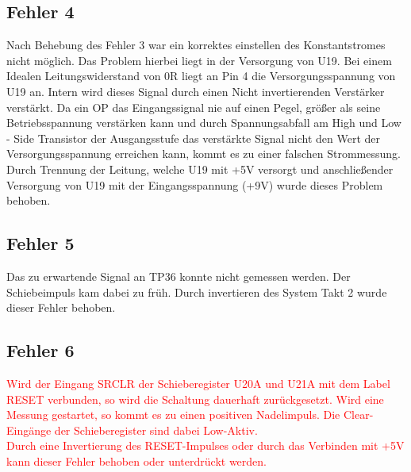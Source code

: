 \subsection{Fehler 4}

Nach Behebung des \glqq Fehler 3 \grqq{} war ein korrektes einstellen des Konstantstromes nicht möglich. Das Problem hierbei liegt in der Versorgung von U19. Bei einem Idealen Leitungswiderstand von 0R liegt an Pin 4 die Versorgungsspannung von U19 an. Intern wird dieses Signal durch einen \glqq Nicht invertierenden Verstärker \grqq{} verstärkt. Da ein OP das Eingangssignal nie auf einen Pegel, größer als seine Betriebsspannung verstärken kann und durch Spannungsabfall am \glqq High und Low - Side Transistor \grqq{} der Ausgangsstufe das verstärkte Signal nicht den Wert der Versorgungsspannung erreichen kann, kommt es zu einer falschen Strommessung. Durch Trennung der Leitung, welche U19 mit +5V versorgt und anschließender Versorgung von U19 mit der Eingangsspannung (+9V) wurde dieses Problem behoben. 

\newpage

\subsection{Fehler 5}

Das zu erwartende Signal an TP36 konnte nicht gemessen werden. Der Schiebeimpuls kam dabei zu früh. Durch invertieren des \glqq System Takt 2 \grqq{} wurde dieser Fehler behoben.



\subsection{Fehler 6}

\textcolor{red}{
Wird der Eingang \glqq SRCLR \grqq{} der Schieberegister U20A und U21A mit dem Label \glqq RESET \grqq{} verbunden, so wird die Schaltung dauerhaft zurückgesetzt. 
Wird eine Messung gestartet, so kommt es zu einen positiven Nadelimpuls. Die \glqq Clear-Eingänge \grqq{} der Schieberegister sind dabei Low-Aktiv. 
\\
Durch eine Invertierung des RESET-Impulses oder durch das Verbinden mit +5V kann dieser Fehler behoben oder unterdrückt werden.
}
